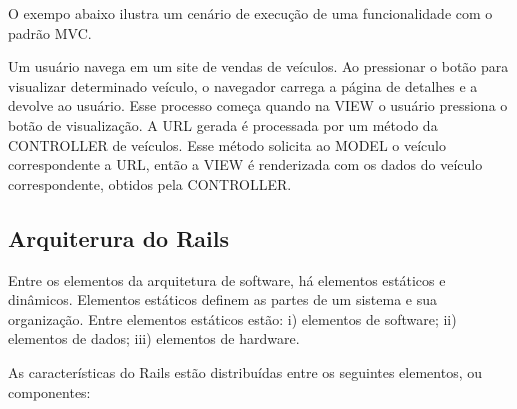 O exempo abaixo ilustra um cenário de execução de uma funcionalidade com o padrão MVC.

\begin{mdframed}[frametitle={Exemplo},roundcorner=5pt]
Um usuário navega em um site de vendas de veículos. Ao pressionar o botão para visualizar determinado veículo, o navegador carrega a página de detalhes e a devolve ao usuário. Esse processo começa quando na VIEW o usuário pressiona o botão de visualização. A URL gerada é processada por um método da CONTROLLER de veículos. Esse método solicita ao MODEL o veículo correspondente a URL, então a VIEW é renderizada com os dados do veículo correspondente, obtidos pela CONTROLLER.
\end{mdframed}


\subsection{Arquiterura do Rails}

Entre os elementos da arquitetura de software, há elementos estáticos e dinâmicos. Elementos estáticos definem as partes de um sistema e sua organização. Entre elementos estáticos estão: i) elementos de software; ii) elementos de dados; iii) elementos de hardware. 

As características do Rails estão distribuídas entre os seguintes elementos, ou componentes:

